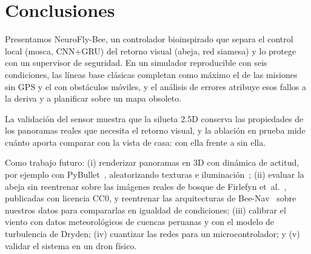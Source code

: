 \section{Conclusiones}
Presentamos NeuroFly-Bee, un controlador bioinspirado que separa el control local (mosca,
CNN+GRU) del retorno visual (abeja, red siamesa) y lo protege con un supervisor de seguridad.
En un simulador reproducible con seis condiciones, las líneas base clásicas completan como
máximo el \nfbMejorClasicoSinGPS{} de las misiones sin GPS y el \nfbMejorClasicoMoviles{} con
obstáculos móviles, y el análisis de errores atribuye esos fallos a la deriva y a planificar
sobre un mapa obsoleto. 

La validación del sensor muestra que la silueta 2.5D conserva las propiedades de los
panoramas reales que necesita el retorno visual, y la ablación en prueba mide cuánto aporta
comparar con la vista de casa: \nfbAblAbejaCompleta{} con ella frente a
\nfbAblAbejaVistaUnica{} sin ella.

Como trabajo futuro: (i) renderizar panoramas en 3D con dinámica de actitud, por ejemplo con
PyBullet~\cite{panerati2021}, aleatorizando texturas e iluminación~\cite{tobin2017};
(ii) evaluar la abeja sin reentrenar sobre las imágenes reales de bosque de Firlefyn
et~al.~\cite{firlefyn2024}, publicadas con licencia CC0, y reentrenar las arquitecturas de
Bee-Nav~\cite{ou2026} sobre nuestros datos para compararlas en igualdad de condiciones;
(iii) calibrar el viento con datos meteorológicos de cuencas peruanas y con el modelo de
turbulencia de Dryden; (iv) cuantizar las redes para un microcontrolador; y (v) validar el
sistema en un dron físico.
